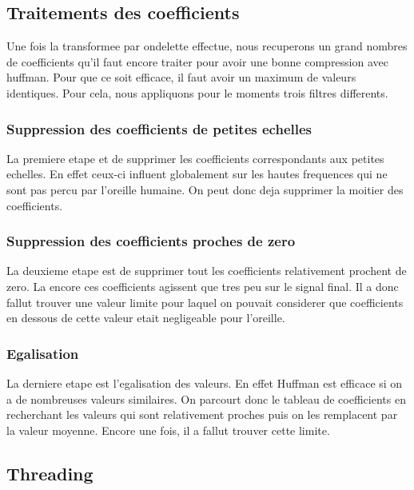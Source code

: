 \documentclass[a4paper,12pt]{article}
\begin{document}
\subsection{Traitements des coefficients}
Une fois la transformee par ondelette effectue, nous recuperons un
grand nombres de coefficients qu'il faut encore traiter pour avoir une
bonne compression avec huffman. Pour que ce soit efficace, il faut
avoir un maximum de valeurs identiques. Pour cela, nous appliquons
pour le moments trois filtres differents.
\subsubsection{Suppression des coefficients de petites echelles}
La premiere etape et de supprimer les coefficients correspondants aux
petites echelles. En effet ceux-ci influent globalement sur les hautes
frequences qui ne sont pas percu par l'oreille humaine. On peut donc
deja supprimer la moitier des coefficients.
\subsubsection{Suppression des coefficients proches de zero}
La deuxieme etape est de supprimer tout les coefficients relativement
prochent de zero. La encore ces coefficients agissent que tres peu sur
le signal final. Il a donc fallut trouver une valeur limite pour
laquel on pouvait considerer que coefficients en dessous de cette
valeur etait negligeable pour l'oreille.
\subsubsection{Egalisation}
La derniere etape est l'egalisation des valeurs. En effet Huffman est
efficace si on a de nombreuses valeurs similaires. On parcourt donc le
tableau de coefficients en recherchant les valeurs qui sont
relativement proches puis on les remplacent par la valeur
moyenne. Encore une fois, il a fallut trouver cette limite.
	\subsection{Threading}
\end{document}
